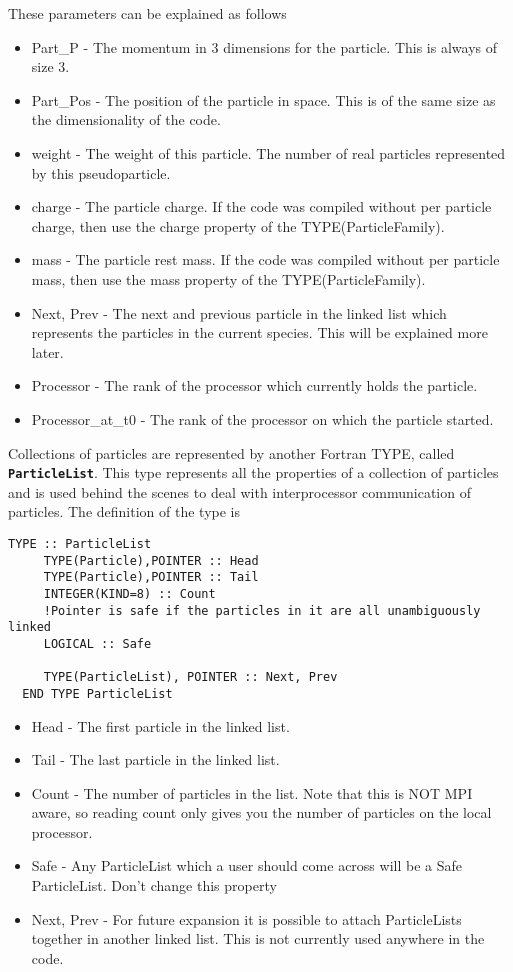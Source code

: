 \documentclass[12pt]{article}
\newcommand{\simpleboxverbatim}{\begin{Verbatim}[obeytabs=true,frame=single,
  framerule=0.5mm,rulecolor=\color{warwickmid}]}
\newcommand{\inlinecode}[1]{{\color{warwickred} \bf\texttt{#1}}}
\begin{document}
These parameters can be explained as follows
\begin{itemize}
\item Part\_P - The momentum in 3 dimensions for the particle. This is always
  of size 3.
\item Part\_Pos - The position of the particle in space. This is of the same
  size as the dimensionality of the code.
\item weight - The weight of this particle. The number of real particles
  represented by this pseudoparticle.
\item charge - The particle charge. If the code was compiled without per
  particle charge, then use the charge property of the TYPE(ParticleFamily).
\item mass - The particle rest mass. If the code was compiled without per
  particle mass, then use the mass property of the TYPE(ParticleFamily).
\item Next, Prev - The next and previous particle in the linked list which
  represents the particles in the current species. This will be explained more
  later.
\item Processor - The rank of the processor which currently holds the
  particle.
\item Processor\_at\_t0 - The rank of the processor on which the particle
  started.
\end{itemize}

Collections of particles are represented by another Fortran TYPE, called
\inlinecode{ParticleList}. This type represents all the properties of a
collection of particles and is used behind the scenes to deal with
interprocessor communication of particles. The definition of the type is

\simpleboxverbatim
  TYPE :: ParticleList
     TYPE(Particle),POINTER :: Head
     TYPE(Particle),POINTER :: Tail
     INTEGER(KIND=8) :: Count
     !Pointer is safe if the particles in it are all unambiguously linked
     LOGICAL :: Safe

     TYPE(ParticleList), POINTER :: Next, Prev
  END TYPE ParticleList
\end{Verbatim}
\begin{itemize}
\item Head - The first particle in the linked list.
\item Tail - The last particle in the linked list.
\item Count - The number of particles in the list. Note that this is NOT MPI
  aware, so reading count only gives you the number of particles on the local
  processor.
\item Safe - Any ParticleList which a user should come across will be a Safe
  ParticleList. Don't change this property
\item Next, Prev - For future expansion it is possible to attach ParticleLists
  together in another linked list. This is not currently used anywhere in the
  code.
\end{itemize}
\end{document}
